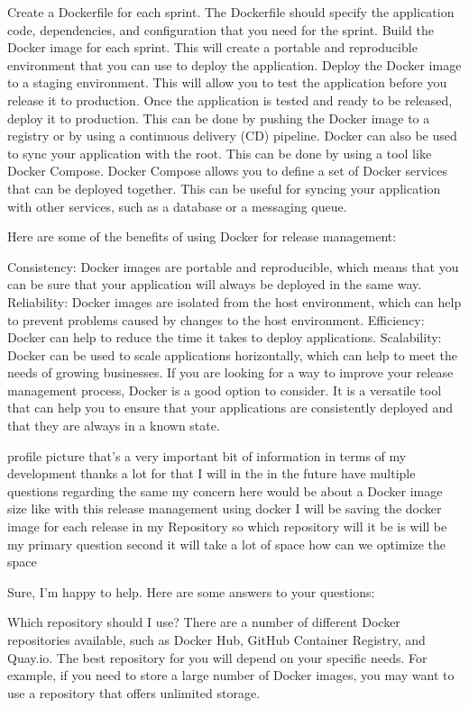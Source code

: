 \documentclass[11pt]{article}
\begin{document}
Create a Dockerfile for each sprint. The Dockerfile should specify the application code, dependencies, and configuration that you need for the sprint.
Build the Docker image for each sprint. This will create a portable and reproducible environment that you can use to deploy the application.
Deploy the Docker image to a staging environment. This will allow you to test the application before you release it to production.
Once the application is tested and ready to be released, deploy it to production. This can be done by pushing the Docker image to a registry or by using a continuous delivery (CD) pipeline.
Docker can also be used to sync your application with the root. This can be done by using a tool like Docker Compose. Docker Compose allows you to define a set of Docker services that can be deployed together. This can be useful for syncing your application with other services, such as a database or a messaging queue.

Here are some of the benefits of using Docker for release management:

Consistency: Docker images are portable and reproducible, which means that you can be sure that your application will always be deployed in the same way.
Reliability: Docker images are isolated from the host environment, which can help to prevent problems caused by changes to the host environment.
Efficiency: Docker can help to reduce the time it takes to deploy applications.
Scalability: Docker can be used to scale applications horizontally, which can help to meet the needs of growing businesses.
If you are looking for a way to improve your release management process, Docker is a good option to consider. It is a versatile tool that can help you to ensure that your applications are consistently deployed and that they are always in a known state.

profile picture
that's a very important bit of information in terms of my development
thanks a lot for that
I will in the in the future have multiple questions regarding the same
my
concern here would be
about a Docker image size like
with this
release management using docker
I will be saving
the docker image for each release
in my Repository
so which repository will it be
is will be my primary question
second
it will take
a lot of space
how can
we optimize
the space

Sure, I'm happy to help. Here are some answers to your questions:

Which repository should I use?
There are a number of different Docker repositories available, such as Docker Hub, GitHub Container Registry, and Quay.io. The best repository for you will depend on your specific needs. For example, if you need to store a large number of Docker images, you may want to use a repository that offers unlimited storage.
\end{document}
